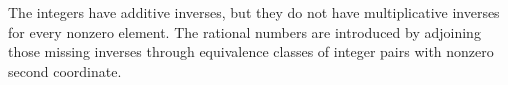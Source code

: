 \begin{remark*}
\label{rem:why-rational-numbers-are-introduced}
The integers have additive inverses, but they do not have multiplicative
inverses for every nonzero element. The rational numbers are introduced by
adjoining those missing inverses through equivalence classes of integer
pairs with nonzero second coordinate.
\end{remark*}
